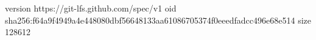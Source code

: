 version https://git-lfs.github.com/spec/v1
oid sha256:f64a9f4949a4e448080dbf56648133aa61086705374f0eeedfadcc496e68e514
size 128612
